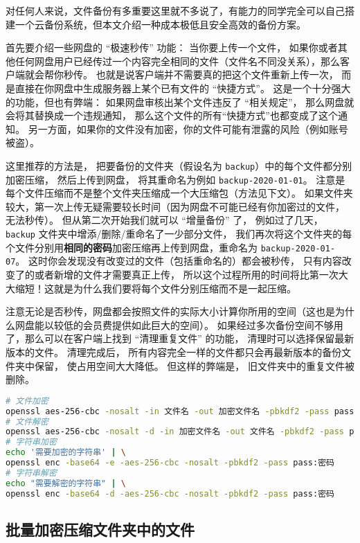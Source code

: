 
对任何人来说，文件备份有多重要这里就不多说了，有能力的同学完全可以自己搭建一个云备份系统，但本文介绍一种成本极低且安全高效的备份方案。

首先要介绍一些网盘的 “极速秒传” 功能： 当你要上传一个文件， 如果你或者其他任何网盘用户已经传过一个内容完全相同的文件（文件名不同没关系），那么客户端就会帮你秒传。 也就是说客户端并不需要真的把这个文件重新上传一次， 而是直接在你网盘中生成服务器上某个已有文件的 “快捷方式”。 这是一个十分强大的功能，但也有弊端： 如果网盘审核出某个文件违反了 “相关规定”， 那么网盘就会将其替换成一个违规通知， 那么这个文件的所有“快捷方式”也都变成了这个通知。 另一方面，如果你的文件没有加密，你的文件可能有泄露的风险（例如账号被盗）。

这里推荐的方法是， 把要备份的文件夹（假设名为 \verb|backup|）中的每个文件都分别加密压缩， 然后上传到网盘， 将其重命名为例如 \verb|backup-2020-01-01|。 注意是每个文件压缩而不是整个文件夹压缩成一个大压缩包（方法见下文）。 如果文件夹较大，第一次上传无疑需要较长时间（因为网盘不可能已经有你加密过的文件， 无法秒传）。 但从第二次开始我们就可以 “增量备份” 了， 例如过了几天， \verb|backup| 文件夹中增添/删除/重命名了一少部分文件， 我们再次将这个文件夹的每个文件分别用\textbf{相同的密码}加密压缩再上传到网盘，重命名为 \verb|backup-2020-01-07|。 这时你会发现没有改变过的文件（包括重命名的）都会被秒传， 只有内容改变了的或者新增的文件才需要真正上传， 所以这个过程所用的时间将比第一次大大缩短！这就是为什么我们要将每个文件分别压缩而不是一起压缩。

注意无论是否秒传，网盘都会按照文件的实际大小计算你所用的空间（这也是为什么网盘能以较低的会员费提供如此巨大的空间）。 如果经过多次备份空间不够用了，那么可以在客户端上找到 “清理重复文件” 的功能， 清理时可以选择保留最新版本的文件。 清理完成后， 所有内容完全一样的文件都只会再最新版本的备份文件夹中保留， 使占用空间大大降低。 但这样的弊端是， 旧文件夹中的重复文件被删除。

\begin{lstlisting}[language=bash]
# 文件加密
openssl aes-256-cbc -nosalt -in 文件名 -out 加密文件名 -pbkdf2 -pass pass:密码
# 文件解密
openssl aes-256-cbc -nosalt -d -in 加密文件名 -out 文件名 -pbkdf2 -pass pass:密码
# 字符串加密
echo '需要加密的字符串' | \
openssl enc -base64 -e -aes-256-cbc -nosalt -pbkdf2 -pass pass:密码
# 字符串解密
echo "需要解密的字符串" | \
openssl enc -base64 -d -aes-256-cbc -nosalt -pbkdf2 -pass pass:密码
\end{lstlisting}

\subsection{批量加密压缩文件夹中的文件}


